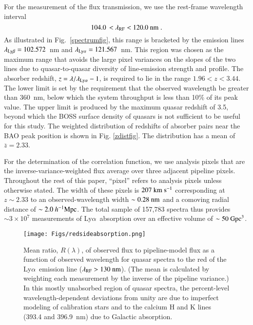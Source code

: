 \documentclass{aa}
\newcommand{\lamrf}{\lambda_{\rm RF}}
\newcommand{\lamlya}{\lambda_{\rm Ly\alpha}}
\newcommand{\hMpc}{h^{-1}{\rm Mpc}}
\newcommand{\Lya}{Ly$\alpha$~}
\begin{document}
For the measurement of the flux transmission, we use the
rest-frame wavelength interval
\begin{equation}
104.0\,<\lamrf<120.0~{\rm nm} \; .
\label{rflambdarange}
\end{equation}
As illustrated in Fig.~\ref{spectrumfig},
this range is 
bracketed by the  emission lines $\lambda_{\rm Ly\beta}=102.572$~nm and 
$\lamlya=121.567$~nm.  This region
was chosen as the maximum range that avoids the large pixel
variances on the slopes of the two lines due to  quasar-to-quasar
diversity of line-emission strength and profile.
The absorber redshift, 
$z=\lambda/\lamlya-1$,
is required to lie in the range 
$1.96<z<3.44$. The lower limit
is set by the requirement that the observed wavelength be greater
than 360~nm, 
below which the system throughput is less than 10\% of its peak value. 
The upper limit is produced by the maximum quasar
redshift of 3.5, beyond which the BOSS surface density of quasars
is not sufficient to be useful for this study. 
The weighted distribution of redshifts of absorber pairs
near the BAO peak position 
is shown in Fig. \ref{zdistfig}.
The distribution has a mean of $\overline{z}=2.33$.



For the determination of the correlation function, we
use analysis pixels 
that are the inverse-variance-weighted flux average
over three adjacent pipeline pixels.
Throughout the rest of this paper, ``pixel'' refers to analysis
pixels unless otherwise stated.
The width of these pixels is $207~{\rm km~s^{-1}}$
corresponding at $z\sim2.33$ to an 
observed-wavelength width $\sim0.28~{\rm nm}$ and a
comoving radial distance of $\sim2.0~\hMpc$.
The total sample of 157,783
spectra thus provides $\sim 3\times10^7$ measurements
of \Lya absorption
over an effective volume of $\sim 50~{\rm Gpc}^3$. 



\begin{figure}
\begin{center}
\texttt{[image: Figs/redsideabsorption.png]}
\caption{
  Mean ratio, $R(\lambda)$, of observed flux to pipeline-model
  flux as a function of 
observed wavelength for quasar spectra to the red of the \Lya emission
line ($\lambda_{\rm RF}>130~{\rm nm}$).
(The mean is calculated by weighting each measurement by the
inverse of the pipeline variance.) 
In this mostly unabsorbed region of quasar spectra, the percent-level 
wavelength-dependent deviations from
unity are due to  imperfect modeling of calibration stars and
to the calcium H and K lines (393.4 and 396.9~nm) due to Galactic absorption.
}
\label{meanfluxfig}
\end{center}
\end{figure}
\end{document}
